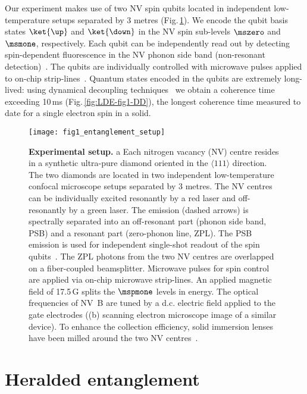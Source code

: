 Our experiment makes use of two NV spin qubits located in independent low-temperature setups separated by 3 metres (Fig.\,\ref{fig:LDE-fig1-setup}). We encode the qubit basis states $\ket{\up}$ and $\ket{\down}$ in the NV spin sub-levels $\mszero$ and $\msmone$, respectively. Each qubit can be independently read out by detecting spin-dependent fluorescence in the NV phonon side band (non-resonant detection)~\cite{Robledo_Nature_2011}. The qubits are individually controlled with microwave pulses applied to on-chip strip-lines~\cite{Lange_Science_2010}. Quantum states encoded in the qubits are extremely long-lived: using dynamical decoupling techniques~\cite{Lange_Science_2010} we obtain a coherence time exceeding 10$\,$ms (Fig.\,\ref{fig:LDE-fig1-DD}), the longest coherence time measured to date for a single electron spin in a solid.

\begin{figure}[tp]
	\centering
	\texttt{[image: fig1\_entanglement\_setup]}
	\caption{\label{fig:LDE-fig1-setup} \textbf{Experimental setup.} a Each nitrogen vacancy (NV) centre resides in a synthetic ultra-pure diamond oriented in the $\langle 111\rangle$ direction. The two diamonds are located in two independent low-temperature confocal microscope setups separated by 3 metres. The NV centres can be individually excited resonantly by a red laser and off-resonantly by a green laser. The emission (dashed arrows) is spectrally separated into an off-resonant part (phonon side band, PSB) and a resonant part (zero-phonon line, ZPL). The PSB emission is used for independent single-shot readout of the spin qubits~\cite{Robledo_Nature_2011}. The ZPL photons from the two NV centres are overlapped on a fiber-coupled beamsplitter. Microwave pulses for spin control are applied via on-chip microwave strip-lines. An applied magnetic field of 17.5\,G splits the $\mspmone$ levels in energy. The optical frequencies of NV~B are tuned by a d.c. electric field applied to the gate electrodes ((b) scanning electron microscope image of a similar device). To enhance the collection efficiency, solid immersion lenses have been milled around the two NV centres~\cite{Robledo_Nature_2011}. }
\end{figure}

	
\section{Heralded entanglement}\label{sec:HE}

